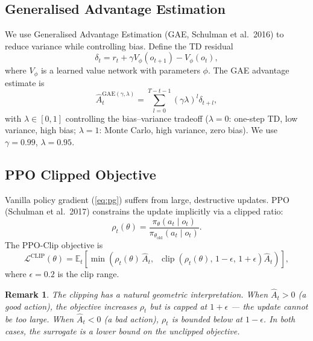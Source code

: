 \documentclass[11pt,a4paper]{article}
\newtheorem{remark}[theorem]{Remark}
\newcommand{\E}{\mathbb{E}}
\newcommand{\cL}{\mathcal{L}}
\newcommand{\policy}{\pi}
\newcommand{\clip}{\operatorname{clip}}
\begin{document}
\subsection{Generalised Advantage Estimation}

We use Generalised Advantage Estimation (GAE, Schulman et al.\ 2016)
to reduce variance while controlling bias.
Define the TD residual
\begin{equation}
  \delta_t = r_t + \gamma V_\phi(o_{t+1}) - V_\phi(o_t),
\end{equation}
where $V_\phi$ is a learned value network with parameters $\phi$.
The GAE advantage estimate is
\begin{equation}
  \hat{A}_t^{\text{GAE}(\gamma, \lambda)}
  = \sum_{l=0}^{T-t-1} (\gamma\lambda)^l \delta_{t+l},
  \label{eq:gae}
\end{equation}
with $\lambda \in [0,1]$ controlling the bias--variance tradeoff
($\lambda=0$: one-step TD, low variance, high bias;
 $\lambda=1$: Monte Carlo, high variance, zero bias).
We use $\gamma = 0.99$, $\lambda = 0.95$.

\subsection{PPO Clipped Objective}

Vanilla policy gradient (\ref{eq:pg}) suffers from large, destructive updates.
PPO (Schulman et al.\ 2017) constrains the update implicitly via a clipped ratio:
\begin{equation}
  \rho_t(\theta) = \frac{\policy_\theta(a_t \mid o_t)}{\policy_{\theta_{\text{old}}}(a_t \mid o_t)}.
\end{equation}
The PPO-Clip objective is
\begin{equation}
  \cL^{\text{CLIP}}(\theta)
  = \E_t\left[
      \min\!\left(
        \rho_t(\theta)\,\hat{A}_t,\;\;
        \clip\!\left(\rho_t(\theta),\, 1{-}\epsilon,\, 1{+}\epsilon\right)\hat{A}_t
      \right)
    \right],
  \label{eq:ppo}
\end{equation}
where $\epsilon = 0.2$ is the clip range.

\begin{remark}
The clipping has a natural geometric interpretation.
When $\hat{A}_t > 0$ (a good action), the objective increases $\rho_t$
but is capped at $1+\epsilon$ — the update cannot be too large.
When $\hat{A}_t < 0$ (a bad action), $\rho_t$ is bounded below at $1-\epsilon$.
In both cases, the surrogate is a lower bound on the unclipped objective.
\end{remark}
\end{document}
